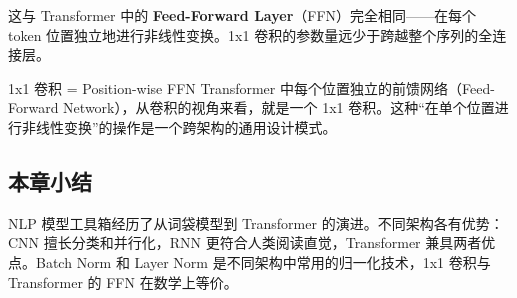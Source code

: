 这与 Transformer 中的 \textbf{Feed-Forward Layer}（FFN）完全相同——在每个 token 位置独立地进行非线性变换。1x1 卷积的参数量远少于跨越整个序列的全连接层。

\begin{importantbox}{1x1 卷积 = Position-wise FFN}
Transformer 中每个位置独立的前馈网络（Feed-Forward Network），从卷积的视角来看，就是一个 1x1 卷积。这种``在单个位置进行非线性变换''的操作是一个跨架构的通用设计模式。
\end{importantbox}

\subsection{本章小结}

NLP 模型工具箱经历了从词袋模型到 Transformer 的演进。不同架构各有优势：CNN 擅长分类和并行化，RNN 更符合人类阅读直觉，Transformer 兼具两者优点。Batch Norm 和 Layer Norm 是不同架构中常用的归一化技术，1x1 卷积与 Transformer 的 FFN 在数学上等价。


